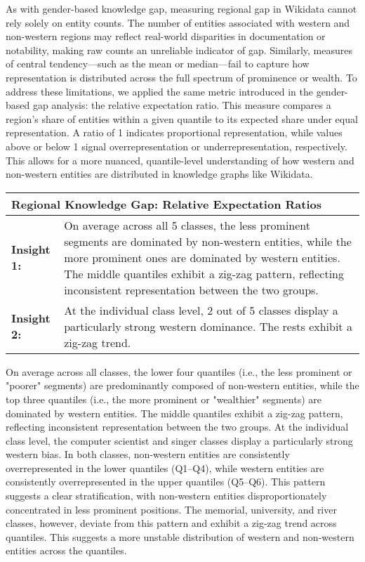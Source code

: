 As with gender-based knowledge gap, measuring regional gap in Wikidata cannot rely solely on entity counts. The number of entities associated with western and non-western regions may reflect real-world disparities in documentation or notability, making raw counts an unreliable indicator of gap. Similarly, measures of central tendency—such as the mean or median—fail to capture how representation is distributed across the full spectrum of prominence or wealth. To address these limitations, we applied the same metric introduced in the gender-based gap analysis: the relative expectation ratio. This measure compares a region’s share of entities within a given quantile to its expected share under equal representation. A ratio of 1 indicates proportional representation, while values above or below 1 signal overrepresentation or underrepresentation, respectively. This allows for a more nuanced, quantile-level understanding of how western and non-western entities are distributed in knowledge graphs like Wikidata.

\begin{table}[h]
    \centering
    \renewcommand{\arraystretch}{1.3}
    \begin{tabular}{|l p{12cm}|} 
        \hline
        \multicolumn{2}{|l|}{\textbf{Regional Knowledge Gap: Relative Expectation Ratios}} \\
        \hline
        \textbf{Insight 1:} & On average across all 5 classes, the less prominent segments are dominated by non-western entities, while the more prominent ones are dominated by western entities. The middle quantiles exhibit a zig-zag pattern, reflecting inconsistent representation between the two groups. \\
        \textbf{Insight 2:} & At the individual class level, 2 out of 5 classes display a particularly strong western dominance. The rests exhibit a zig-zag trend. \\
        \hline
    \end{tabular}
\end{table}

On average across all classes, the lower four quantiles (i.e., the less prominent or "poorer" segments) are predominantly composed of non-western entities, while the top three quantiles (i.e., the more prominent or "wealthier" segments) are dominated by western entities. The middle quantiles exhibit a zig-zag pattern, reflecting inconsistent representation between the two groups. At the individual class level, the computer scientist and singer classes display a particularly strong western bias. In both classes, non-western entities are consistently overrepresented in the lower quantiles (Q1–Q4), while western entities are consistently overrepresented in the upper quantiles (Q5–Q6). This pattern suggests a clear stratification, with non-western entities disproportionately concentrated in less prominent positions. The memorial, university, and river classes, however, deviate from this pattern and exhibit a zig-zag trend across quantiles. This suggests a more unstable distribution of western and non-western entities across the quantiles.

